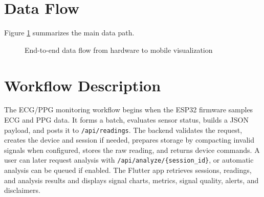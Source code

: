 \section{Data Flow}

Figure \ref{fig:data-flow} summarizes the main data path.

\begin{figure}[H]
\centering
{}
\caption{End-to-end data flow from hardware to mobile visualization}
\label{fig:data-flow}
\end{figure}

\section{Workflow Description}

The ECG/PPG monitoring workflow begins when the ESP32 firmware samples ECG and PPG data. It forms a batch, evaluates sensor status, builds a JSON payload, and posts it to \texttt{/api/readings}. The backend validates the request, creates the device and session if needed, prepares storage by compacting invalid signals when configured, stores the raw reading, and returns device commands. A user can later request analysis with \texttt{/api/analyze/\{session\_id\}}, or automatic analysis can be queued if enabled. The Flutter app retrieves sessions, readings, and analysis results and displays signal charts, metrics, signal quality, alerts, and disclaimers.
